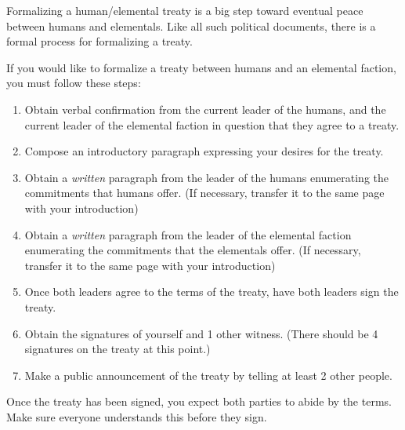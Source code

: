 \documentclass[green]{elementals}
\begin{document}
\name{\gTreaty{}}

Formalizing a human/elemental treaty is a big step toward eventual peace between humans and elementals. Like all such political documents, there is a formal process for formalizing a treaty.

If you would like to formalize a treaty between humans and an elemental faction, you must follow these steps:
\begin{enumerate}
  \item Obtain verbal confirmation from the current leader of the humans, and the current leader of the elemental faction in question that they agree to a treaty.
  \item Compose an introductory paragraph expressing your desires for the treaty.
  \item Obtain a \emph{written} paragraph from the leader of the humans enumerating the commitments that humans offer. (If necessary, transfer it to the same page with your introduction)
  \item Obtain a \emph{written} paragraph from the leader of the elemental faction enumerating the commitments that the elementals offer. (If necessary, transfer it to the same page with your introduction)
  \item Once both leaders agree to the terms of the treaty, have both leaders sign the treaty.
  \item Obtain the signatures of yourself and 1 other witness. (There should be 4 signatures on the treaty at this point.)
  \item Make a public announcement of the treaty by telling at least 2 other people.
\end{enumerate}

Once the treaty has been signed, you expect both parties to abide by the terms. Make sure everyone understands this before they sign.
\end{document}
